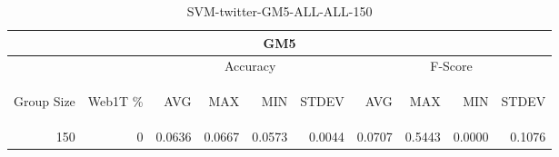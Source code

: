 \begin{center}
\begin{table}[htbp] 
 \begin{center}
\begin{tabular}{ | r | r | r | r | r | r | r | r | r | r |}
\hline
\multicolumn{10}{|c|}{GM5}\\
\hline
 & & \multicolumn{4}{|c|}{Accuracy} & \multicolumn{4}{|c|}{F-Score}\\ \cline{3-10}
\begin{sideways}Group Size\end{sideways} & \begin{sideways}Web1T \%\end{sideways} & \begin{sideways}AVG\end{sideways} & \begin{sideways}MAX\end{sideways} & \begin{sideways}MIN\end{sideways} & \begin{sideways}STDEV\end{sideways} & \begin{sideways}AVG\end{sideways} & \begin{sideways}MAX\end{sideways} & \begin{sideways}MIN\end{sideways} & \begin{sideways}STDEV\end{sideways}\\
\hline
\multirow{0}{*}{150}
 & 0 & 0.0636 & 0.0667 & 0.0573 & 0.0044 & 0.0707 & 0.5443 & 0.0000 & 0.1076\\ \cline{2-10}
\hline
\end{tabular}
\caption{SVM-twitter-GM5-ALL-ALL-150}
\label{table:SVM-twitter-GM5-ALL-ALL-150}
\end{center}
 \end{table}
\end{center}

